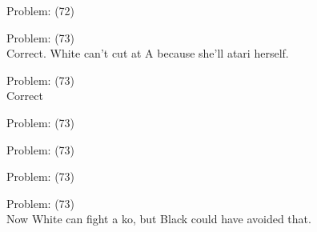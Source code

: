 \documentclass[11pt]{article}
\begin{document}
\begin{minipage}[t]{0.5\textwidth}
  {\centering
  
  Problem: (72)\\
  
  }
\end{minipage}
\begin{minipage}[t]{0.5\textwidth}
  {\centering
  
  Problem: (73)\\
  Correct. White can't cut at A because she'll atari herself.\\
  }
\end{minipage}
\begin{minipage}[t]{0.5\textwidth}
  {\centering
  
  Problem: (73)\\
  Correct\\
  }
\end{minipage}
\begin{minipage}[t]{0.5\textwidth}
  {\centering
  
  Problem: (73)\\
  
  }
\end{minipage}
\begin{minipage}[t]{0.5\textwidth}
  {\centering
  
  Problem: (73)\\
  
  }
\end{minipage}
\begin{minipage}[t]{0.5\textwidth}
  {\centering
  
  Problem: (73)\\
  
  }
\end{minipage}
\begin{minipage}[t]{0.5\textwidth}
  {\centering
  
  Problem: (73)\\
  Now White can fight a ko, but Black could have avoided that.\\
  }
\end{minipage}
\end{document}
